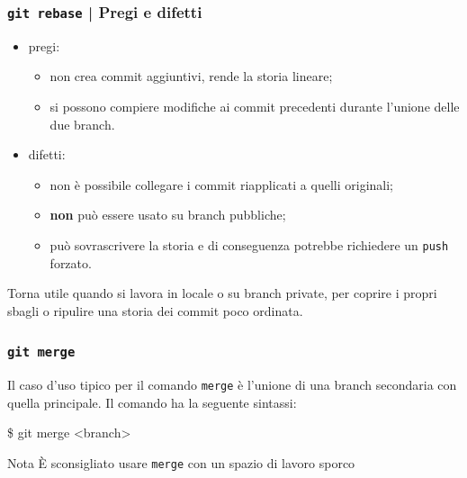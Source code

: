 \documentclass{beamer}
\begin{document}
\begin{frame}
  \frametitle{\texttt{git rebase} | Pregi e difetti}
  \begin{itemize}
    \item pregi: \begin{itemize}
      \item non crea commit aggiuntivi, rende la storia lineare;
      \item si possono compiere modifiche ai commit precedenti durante l'unione
        delle due branch.
    \end{itemize}
    \item difetti: \begin{itemize}
      \item non \`e possibile collegare i commit riapplicati a quelli originali;
      \item \textbf{non} pu\`o essere usato su branch pubbliche;
      \item pu\`o sovrascrivere la storia e di conseguenza potrebbe
        richiedere un \texttt{push} forzato.
    \end{itemize}
  \end{itemize}

  Torna utile quando si lavora in locale o su branch private, per coprire i
  propri sbagli o ripulire una storia dei commit poco ordinata.
\end{frame}

\begin{frame}
  \frametitle{\texttt{git merge}}
  Il caso d'uso tipico per il comando \texttt{merge} \`e l'unione di una branch
  secondaria con quella principale. Il comando ha la seguente sintassi:
  \begin{semiverbatim}
  \$ git merge <branch>
  \end{semiverbatim}

  \begin{figure}
  \end{figure}

  \pause
  \begin{block}{Nota}
    \`E sconsigliato usare \texttt{merge} con un spazio di lavoro sporco
  \end{block}
\end{frame}
\end{document}
